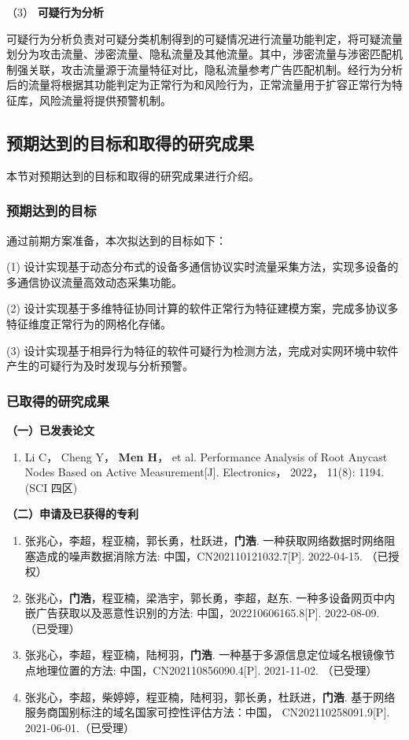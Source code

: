 （3） \textbf{可疑行为分析}\quad

可疑行为分析负责对可疑分类机制得到的可疑情况进行流量功能判定，将可疑流量划分为攻击流量、涉密流量、隐私流量及其他流量。其中，涉密流量与涉密匹配机制强关联，攻击流量源于流量特征对比，隐私流量参考广告匹配机制。经行为分析后的流量将根据其功能判定为正常行为和风险行为，正常流量用于扩容正常行为特征库，风险流量将提供预警机制。

\FloatBarrier
\subsection{预期达到的目标和取得的研究成果}
本节对预期达到的目标和取得的研究成果进行介绍。
\subsubsection{预期达到的目标}

通过前期方案准备，本次拟达到的目标如下：

(1) 设计实现基于动态分布式的设备多通信协议实时流量采集方法，实现多设备的多通信协议流量高效动态采集功能。

(2) 设计实现基于多维特征协同计算的软件正常行为特征建模方案，完成多协议多特征维度正常行为的网格化存储。

(3) 设计实现基于相异行为特征的软件可疑行为检测方法，完成对实网环境中软件产生的可疑行为及时发现与分析预警。

\subsubsection{已取得的研究成果}

	\noindent\textbf{（一）已发表论文}
	\begin{enumerate}
	\item Li C， Cheng Y， \textbf{Men H}， et al. Performance Analysis of Root Anycast Nodes Based on Active Measurement[J]. Electronics， 2022， 11(8): 1194. \quad (SCI 四区)
\end{enumerate}
\noindent\textbf{（二）申请及已获得的专利}
\begin{enumerate}
\item 张兆心，李超，程亚楠，郭长勇，杜跃进，\textbf{门浩}. 一种获取网络数据时网络阻塞造成的噪声数据消除方法: 中国，CN202110121032.7[P]. 2022-04-15. （已授权）
\item 张兆心，\textbf{门浩}，程亚楠，梁浩宇，郭长勇，李超，赵东. 一种多设备网页中内嵌广告获取以及恶意性识别的方法: 中国，202210606165.8[P]. 2022-08-09. （已受理）
\item 张兆心，李超，程亚楠，陆柯羽，\textbf{门浩}. 一种基于多源信息定位域名根镜像节点地理位置的方法: 中国，CN202110856090.4[P]. 2021-11-02. （已受理）
\item 张兆心，李超，柴婷婷，程亚楠，陆柯羽，郭长勇，杜跃进，\textbf{门浩}. 基于网络服务商国别标注的域名国家可控性评估方法：中国， CN202110258091.9[P]. 2021-06-01.（已受理）
\end{enumerate}

